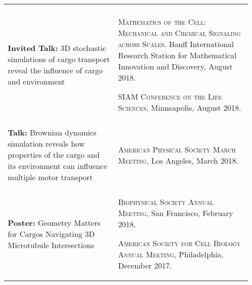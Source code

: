 \documentclass[letterpaper,10pt]{article} %
\makeatletter
\newcommand\cellwidth{\TX@col@width}
\makeatother
\begin{document}
\begin{tabularx}{\textwidth}{p{} | X}
\multicolumn{2}{c}{} \\

\begin{minipage}{.4\textwidth}
\textbf{Invited Talk:} 3D stochastic simulations of cargo transport reveal the influence of cargo and environment
\end{minipage}
&
\begin{minipage}{\cellwidth}
\begin{description}[itemsep=.25ex,labelsep=0em]
\item \textsc{Mathematics of the Cell: Mechanical and Chemical Signaling across Scales.} Banff International Research Station for Mathematical Innovation and Discovery, August 2018.
\item \textsc{SIAM Conference on the Life Sciences}, Minneapolis, August 2018.
\end{description}
\end{minipage} \\

\multicolumn{2}{c}{} \\

\begin{minipage}{.4\textwidth}
\textbf{Talk:} Brownian dynamics simulation reveals how properties of the cargo and its environment can influence multiple motor transport
\end{minipage}
&
\begin{minipage}{\cellwidth}
\begin{description}[itemsep=.25ex,labelsep=0em]
\item \textsc{American Physical Society March Meeting}, Los Angeles, March 2018.
\end{description}
\end{minipage} \\

\multicolumn{2}{c}{} \\

\begin{minipage}{.4\textwidth}
\textbf{Poster:} Geometry Matters for Cargos Navigating 3D Microtubule Intersections
\end{minipage}
&
\begin{minipage}{\cellwidth}
\begin{description}[itemsep=.25ex,labelsep=0em]
\item \textsc{Biophysical Society Annual Meeting}, San Francisco, February 2018.
\item \textsc{American Society for Cell Biology Annual Meeting}, Philadelphia, December 2017.
\end{description}
\end{minipage} \\


\end{tabularx}
\end{document}
